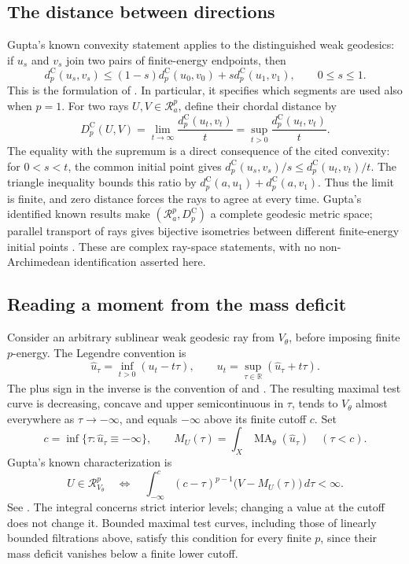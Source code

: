 \subsection{The distance between directions}

Gupta's known convexity statement applies to the distinguished weak
geodesics: if $u_s$ and $v_s$ join two pairs of finite-energy endpoints,
then
\[
 d_p^{\mathrm C}(u_s,v_s)
 \leq(1-s)d_p^{\mathrm C}(u_0,v_0)
       +s d_p^{\mathrm C}(u_1,v_1),\qquad 0\leq s\leq1.
\]
This is the formulation of \cite[Theorem~1.2; Theorems~4.1
and~4.6]{Gupta24BigRaysV1}.  In particular, it specifies which segments
are used also when $p=1$.
For two rays $U,V\in\mathcal R_a^p$, define their chordal distance by
\[
\tag{65.46}
\label{eq:rf-big-chordal-distance}
 D_p^{\mathrm C}(U,V)
 =\lim_{t\to\infty}\frac{d_p^{\mathrm C}(u_t,v_t)}{t}
 =\sup_{t>0}\frac{d_p^{\mathrm C}(u_t,v_t)}{t}.
\]
The equality with the supremum is a direct consequence of the cited
convexity: for $0<s<t$, the common initial point gives
$d_p^{\mathrm C}(u_s,v_s)/s\leq d_p^{\mathrm C}(u_t,v_t)/t$.
The triangle inequality bounds this ratio by
$d_p^{\mathrm C}(a,u_1)+d_p^{\mathrm C}(a,v_1)$.
Thus the limit is finite, and zero distance forces the rays to agree at
every time.  Gupta's identified known results make
$(\mathcal R_a^p,D_p^{\mathrm C})$ a complete geodesic metric space;
parallel transport of rays gives bijective isometries between different
finite-energy initial points
\cite[Theorems~1.3 and~5.2; Lemma~5.3; Theorem~5.7]{Gupta24BigRaysV1}.
These are complex ray-space statements, with no non-Archimedean
identification asserted here.

\subsection{Reading a moment from the mass deficit}

Consider an arbitrary sublinear weak geodesic ray from $V_\theta$,
before imposing finite $p$-energy.  The Legendre convention is
\[
 \widehat u_\tau=\inf_{t>0}(u_t-t\tau),\qquad
 u_t=\sup_{\tau\in\mathbb R}(\widehat u_\tau+t\tau).
\]
The plus sign in the inverse is the convention of
 and
\cite[equation~(18); Theorem~3.7]{DarvasZhang24TwistedV4}.
The resulting maximal test curve is decreasing, concave and
upper semicontinuous in $\tau$, tends to $V_\theta$ almost everywhere
as $\tau\to-\infty$, and equals $-\infty$ above its finite cutoff $c$.
Set
\[
 c=\inf\{\tau:\widehat u_\tau\equiv-\infty\},\qquad
 M_U(\tau)=\int_X\operatorname{MA}_\theta(\widehat u_\tau)
 \quad(\tau<c).
\]
Gupta's known characterization is
\[
\tag{65.47}
\label{eq:rf-big-ray-mass-moment}
 U\in\mathcal R_{V_\theta}^p
 \quad\Longleftrightarrow\quad
 \int_{-\infty}^{c}(c-\tau)^{p-1}
             \bigl(V-M_U(\tau)\bigr)\,d\tau<\infty.
\]
See \cite[Theorem~1.4; Definition~6.2; Theorem~6.5]{Gupta24BigRaysV1}.
The integral concerns strict interior levels; changing a value at the
cutoff does not change it.  Bounded maximal test curves, including those
of linearly bounded filtrations above, satisfy this condition for every
finite $p$, since their mass deficit vanishes below a finite lower cutoff.

